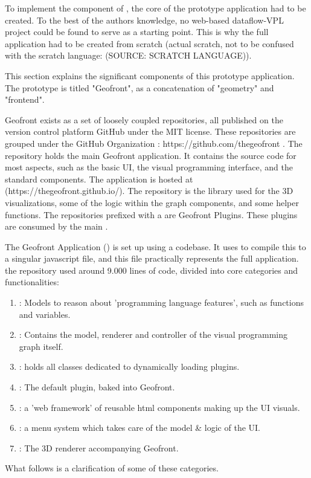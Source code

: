 \label{sec:implementation:representation}
To implement the component of \mySubRQOneTitle, the core of the prototype application had to be created.
To the best of the authors knowledge, no web-based dataflow-VPL project could be found to serve as a starting point. 
This is why the full application had to be created from scratch (actual scratch, not to be confused with the scratch language: (SOURCE: SCRATCH LANGUAGE)). 

This section explains the significant components of this prototype application. 
The prototype is titled "Geofront", as a concatenation of "geometry" and "frontend".

Geofront exists as a set of loosely coupled repositories, all published on the version control platform GitHub under the MIT license. These repositories are grouped under the GitHub Organization  : https://github.com/thegeofront .
The  repository holds the main Geofront application. It contains the source code for most aspects, such as the basic UI, the visual programming interface, and the standard components. The application is hosted at (https://thegeofront.github.io/).
The  repository is the library used for the 3D visualizations, some of the logic within the graph components, and some helper functions.
The repositories prefixed with a  are Geofront Plugins. These plugins are consumed by the main .

The Geofront Application () is set up using a  codebase. It uses  to compile this to a singular javascript file, and this file practically represents the full application. 
the repository used around 9.000 lines of code, divided into core categories and functionalities:
\begin{enumerate}[-]
  \item {}: Models to reason about 'programming language features', such as functions and variables.
  \item {}: Contains the model, renderer and controller of the visual programming graph itself.  
  \item {}: holds all classes dedicated to dynamically loading plugins.
  \item {}: The default plugin, baked into Geofront.   
  \item {}: a 'web framework' of reusable html components making up the UI visuals.
  \item {}: a menu system which takes care of the model \& logic of the UI.
  \item {}: The 3D renderer accompanying Geofront.   
\end{enumerate}
What follows is a clarification of some of these categories.

